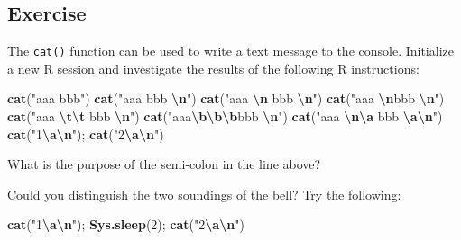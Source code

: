 \documentclass[
]{book}
\newenvironment{Shaded}{\begin{snugshade}}{\end{snugshade}}
\newcommand{\DecValTok}[1]{\textcolor[rgb]{0.00,0.00,0.81}{#1}}
\newcommand{\FunctionTok}[1]{\textcolor[rgb]{0.13,0.29,0.53}{\textbf{#1}}}
\newcommand{\NormalTok}[1]{#1}
\newcommand{\SpecialCharTok}[1]{\textcolor[rgb]{0.81,0.36,0.00}{\textbf{#1}}}
\newcommand{\StringTok}[1]{\textcolor[rgb]{0.31,0.60,0.02}{#1}}
\begin{document}
\subsection{Exercise}\label{exercise}

The \texttt{cat()} function can be used to write a text message to the console. Initialize a new R session and investigate the results of the following R instructions:

\begin{Shaded}
\begin{Highlighting}[]
\FunctionTok{cat}\NormalTok{(}\StringTok{"aaa bbb"}\NormalTok{)}
\FunctionTok{cat}\NormalTok{(}\StringTok{"aaa bbb }\SpecialCharTok{\textbackslash{}n}\StringTok{"}\NormalTok{)}
\FunctionTok{cat}\NormalTok{(}\StringTok{"aaa }\SpecialCharTok{\textbackslash{}n}\StringTok{ bbb }\SpecialCharTok{\textbackslash{}n}\StringTok{"}\NormalTok{)}
\FunctionTok{cat}\NormalTok{(}\StringTok{"aaa }\SpecialCharTok{\textbackslash{}n}\StringTok{bbb }\SpecialCharTok{\textbackslash{}n}\StringTok{"}\NormalTok{)}
\FunctionTok{cat}\NormalTok{(}\StringTok{"aaa }\SpecialCharTok{\textbackslash{}t\textbackslash{}t}\StringTok{ bbb }\SpecialCharTok{\textbackslash{}n}\StringTok{"}\NormalTok{) }
\FunctionTok{cat}\NormalTok{(}\StringTok{"aaa}\SpecialCharTok{\textbackslash{}b\textbackslash{}b\textbackslash{}b}\StringTok{bbb }\SpecialCharTok{\textbackslash{}n}\StringTok{"}\NormalTok{) }
\FunctionTok{cat}\NormalTok{(}\StringTok{"aaa }\SpecialCharTok{\textbackslash{}n\textbackslash{}a}\StringTok{ bbb }\SpecialCharTok{\textbackslash{}a\textbackslash{}n}\StringTok{"}\NormalTok{) }
\FunctionTok{cat}\NormalTok{(}\StringTok{"1}\SpecialCharTok{\textbackslash{}a\textbackslash{}n}\StringTok{"}\NormalTok{); }\FunctionTok{cat}\NormalTok{(}\StringTok{"2}\SpecialCharTok{\textbackslash{}a\textbackslash{}n}\StringTok{"}\NormalTok{)}
\end{Highlighting}
\end{Shaded}

What is the purpose of the semi-colon in the line above?

Could you distinguish the two soundings of the bell? Try the following:

\begin{Shaded}
\begin{Highlighting}[]
\FunctionTok{cat}\NormalTok{(}\StringTok{"1}\SpecialCharTok{\textbackslash{}a\textbackslash{}n}\StringTok{"}\NormalTok{); }\FunctionTok{Sys.sleep}\NormalTok{(}\DecValTok{2}\NormalTok{); }\FunctionTok{cat}\NormalTok{(}\StringTok{"2}\SpecialCharTok{\textbackslash{}a\textbackslash{}n}\StringTok{"}\NormalTok{) }
\end{Highlighting}
\end{Shaded}
\end{document}
